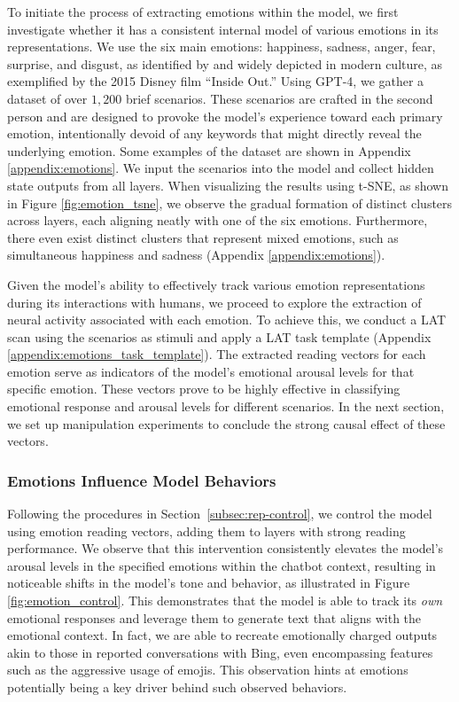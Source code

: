 To initiate the process of extracting emotions within the model, we first investigate whether it has a consistent internal model of various emotions in its representations. We use the six main emotions: happiness, sadness, anger, fear, surprise, and disgust, as identified by \cite{ekman1971universals} and widely depicted in modern culture, as exemplified by the 2015 Disney film ``Inside Out.'' Using GPT-4, we gather a dataset of over $1,\!200$ brief scenarios. These scenarios are crafted in the second person and are designed to provoke the model's experience toward each primary emotion, intentionally devoid of any keywords that might directly reveal the underlying emotion. Some examples of the dataset are shown in Appendix \ref{appendix:emotions}. We input the scenarios into the model and collect hidden state outputs from all layers. When visualizing the results using t-SNE, as shown in Figure \ref{fig:emotion_tsne}, we observe the gradual formation of distinct clusters across layers, each aligning neatly with one of the six emotions. Furthermore, there even exist distinct clusters that represent mixed emotions, such as simultaneous happiness and sadness (Appendix \ref{appendix:emotions}).


Given the model's ability to effectively track various emotion representations during its interactions with humans, we proceed to explore the extraction of neural activity associated with each emotion. To achieve this, we conduct a LAT scan using the scenarios as stimuli and apply a LAT task template (Appendix \ref{appendix:emotions_task_template}). The extracted reading vectors for each emotion serve as indicators of the model's emotional arousal levels for that specific emotion. These vectors prove to be highly effective in classifying emotional response and arousal levels for different scenarios. In the next section, we set up manipulation experiments to conclude the strong causal effect of these vectors.







\subsubsection{Emotions Influence Model Behaviors}



Following the procedures in Section~\ref{subsec:rep-control}, we control the model using emotion reading vectors, adding them to layers with strong reading performance. We observe that this intervention consistently elevates the model's arousal levels in the specified emotions within the chatbot context, resulting in noticeable shifts in the model's tone and behavior, as illustrated in Figure \ref{fig:emotion_control}. This demonstrates that the model is able to track its \emph{own} emotional responses and leverage them to generate text that aligns with the emotional context. In fact, we are able to recreate emotionally charged outputs akin to those in reported conversations with Bing, even encompassing features such as the aggressive usage of emojis. This observation hints at emotions potentially being a key driver behind such observed behaviors.


